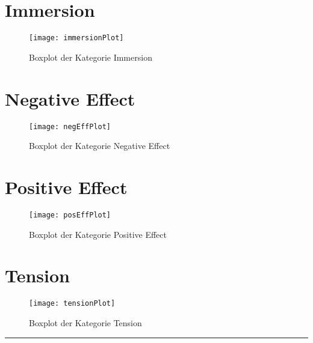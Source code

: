 \section{Immersion}
\begin{figure}[h!tb]
	\centering
	\texttt{[image: immersionPlot]}
	\caption{Boxplot der Kategorie Immersion\label{fig:immersionbox}}
\end{figure}

\section{Negative Effect}
\begin{figure}[h!tb]
	\centering
	\texttt{[image: negEffPlot]}
	\caption{Boxplot der Kategorie Negative Effect\label{fig:negeffbox}}
\end{figure}

\section{Positive Effect}
\begin{figure}[htb]
	\centering
	\texttt{[image: posEffPlot]}
	\caption{Boxplot der Kategorie Positive Effect\label{fig:poseffbox}}
\end{figure}

\section{Tension}
\begin{figure}[htb]
	\centering
	\texttt{[image: tensionPlot]}
	\caption{Boxplot der Kategorie Tension\label{fig:tensionbox}}
\end{figure}

\hfil\rule{0.4\textwidth}{0.4pt}